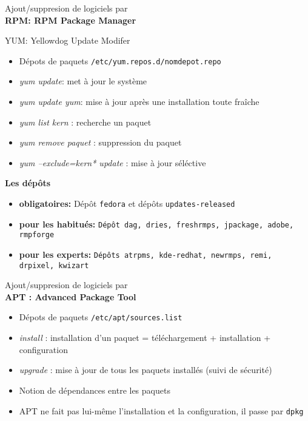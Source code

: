 \documentclass[french]{beamer}
\begin{document}
\begin{frame}
\begin{center}
Ajout/suppresion de logiciels par\\
\textbf{RPM: RPM Package Manager }
\end{center}
\begin{block}{YUM: Yellowdog Update Modifer}
\begin{itemize}
\item Dépots de paquets \texttt{/etc/yum.repos.d/nomdepot.repo}
\item \textit{yum update}: met à jour le système 
\item \textit{yum update yum}: mise à jour après une installation toute fraîche
\item \textit{yum list kern\*} : recherche un paquet 
\item \textit{yum remove paquet} : suppression du paquet
\item \textit{yum --exclude=kern* update} : mise à jour séléctive
\end{itemize}
\end{block}
\end{frame}

\begin{frame}
\textbf{Les dépôts}
\begin{itemize}
\item \textbf{obligatoires: } Dépôt \texttt{fedora} et dépôts
\texttt{updates-released}
\item \textbf{pour les habitués:} \texttt{Dépôt dag, dries, freshrmps, jpackage, adobe,
rmpforge}
\item \textbf{pour les experts:} \texttt{Dépôts atrpms, kde-redhat, newrmps,
remi, drpixel, kwizart}
\end{itemize}
\end{frame}


\begin{frame}
\begin{center}
Ajout/suppresion de logiciels par\\
\textbf{APT : Advanced Package Tool}
\end{center}
\begin{itemize}
\item Dépots de paquets \texttt{/etc/apt/sources.list}
\item \textit{install} : installation d'un paquet = téléchargement + installation + configuration 
\item \textit{upgrade} : mise à jour de tous les paquets installés (suivi de sécurité)
\item Notion de dépendances entre les paquets
\item APT ne fait pas lui-même l'installation et la configuration, il passe par \texttt{dpkg}
\end{itemize}
\end{frame}
\end{document}
